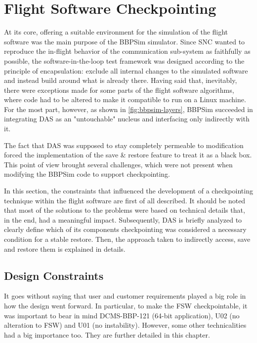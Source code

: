 {
\setlength{\parindent}{2em}
\chapter{Flight Software Checkpointing}\label{cha:das-impl}
At its core, offering a suitable environment for the simulation of the flight software was the main purpose of the BBPSim simulator. Since \gls{SNC} wanted to reproduce the in-flight behavior of the communication sub-system as faithfully as possible, the software-in-the-loop test framework was designed according to the principle of encapsulation: exclude all internal changes to the simulated software and instead build around what is already there. Having said that, inevitably, there were exceptions made for some parts of the flight software algorithms, where code had to be altered to make it compatible to run on a Linux machine. For the most part, however, as shown in \autoref{fig:bbpsim-layers}, BBPSim succeeded in integrating \gls{DAS} as an "untouchable" nucleus and interfacing only indirectly with it.

The fact that DAS was supposed to stay completely permeable to modification forced the implementation of the save \& restore feature to treat it as a black box. This point of view brought several challenges, which were not present when modifying the BBPSim code to support checkpointing. 

In this section, the constraints that influenced the development of a checkpointing technique within the flight software are first of all described. It should be noted that most of the solutions to the problems were based on technical details that, in the end, had a meaningful impact. Subsequently, \gls{DAS} is briefly analyzed to clearly define which of its components checkpointing was considered a necessary condition for a stable restore. Then, the approach taken to indirectly access, save and restore them is explained in details.

\section{Design Constraints}
It goes without saying that user and customer requirements played a big role in how the design went forward. In particular, to make the \gls{FSW} checkpointable, it was important to bear in mind DCMS-BBP-121 (64-bit application), U02 (no alteration to FSW) and U01 (no instability). However, some other technicalities had a big importance too. They are further detailed in this chapter.

}
